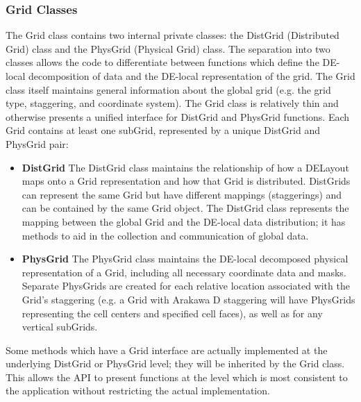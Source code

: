 



\subsubsection{Grid Classes}
The Grid class contains two internal private classes: the DistGrid (Distributed
Grid) class and the PhysGrid (Physical Grid) class.  The separation into two
classes allows the code to differentiate between functions which define the
DE-local decomposition of data and the DE-local representation of the grid.
The Grid class itself maintains general information about the global grid (e.g.
the grid type, staggering, and coordinate system).  The Grid class is relatively
thin and otherwise presents a unified interface for DistGrid and PhysGrid
functions.  Each Grid contains at least one subGrid, represented by a unique
DistGrid and PhysGrid pair:
\begin{itemize}
\item {\bf DistGrid} The DistGrid class maintains the relationship of how
a DELayout maps onto a Grid representation and how that Grid is distributed.
DistGrids can represent the same Grid but have different mappings (staggerings)
and can be contained by the same Grid object. The DistGrid class represents the
mapping between the global Grid and the DE-local data distribution;  it has
methods to aid in the collection and communication of global data.
\item {\bf PhysGrid} The PhysGrid class maintains the DE-local decomposed
physical representation of a Grid, including all necessary coordinate data and
masks.  Separate PhysGrids are created for each relative location associated
with the Grid's staggering (e.g. a Grid with Arakawa D staggering will have
PhysGrids representing the cell centers and specified cell faces), as well as
for any vertical subGrids.
\end{itemize}

Some methods which have a Grid interface are actually implemented
at the underlying DistGrid or PhysGrid level; they will be inherited
by the Grid class.  This allows the API to present functions at the 
level which is most consistent to the application without restricting
the actual implementation.

